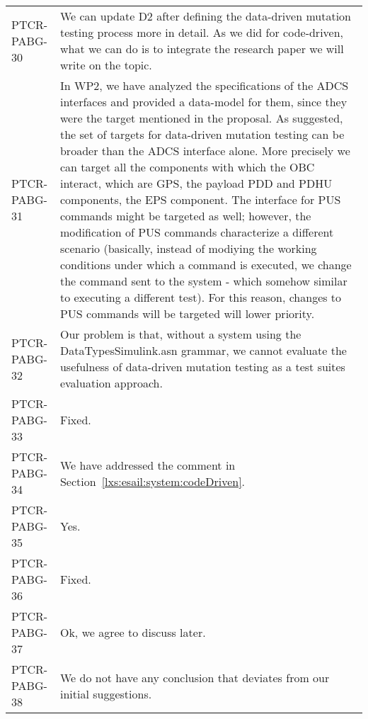 \begin{longtable}{|p{1.5cm}|p{12cm}|@{}}
\begin{minipage}{12cm}
\end{minipage}\\
\hline
PTCR-PABG-30&
\begin{minipage}{12cm}
We can update D2 after defining the data-driven mutation testing process more in detail. As we did for code-driven, what we can do is to integrate the research paper we will write on the topic.
\end{minipage}\\
\hline
PTCR-PABG-31&
\begin{minipage}{12cm}
In WP2, we have analyzed the specifications of the ADCS interfaces and provided a data-model for them, since they were the target mentioned in the proposal. As suggested, the set of targets for data-driven mutation testing can be broader than the ADCS interface alone. More precisely we can target all the components with which the OBC interact, which are GPS, the payload PDD and PDHU components, the EPS component. The interface for PUS commands might be targeted as well; however, the modification of PUS commands characterize a different scenario (basically,  instead of modiying the working conditions under which a command is executed, we change the command sent to the system - which somehow similar to executing a different test). For this reason, changes to PUS commands will be targeted will lower priority. 
\end{minipage}\\
\hline
PTCR-PABG-32&
\begin{minipage}{12cm}
Our problem is that, without a system using the DataTypesSimulink.asn grammar, we cannot evaluate the usefulness of data-driven mutation testing as a test suites evaluation approach.
\end{minipage}\\
\hline
PTCR-PABG-33&
\begin{minipage}{12cm}
Fixed.
\end{minipage}\\
\hline
PTCR-PABG-34&
\begin{minipage}{12cm}
We have addressed the comment in Section~\ref{lxs:esail:system:codeDriven}.
\end{minipage}\\
\hline
PTCR-PABG-35&
\begin{minipage}{12cm}
Yes.
\end{minipage}\\
\hline
PTCR-PABG-36&
\begin{minipage}{12cm}
Fixed.
\end{minipage}\\
\hline
PTCR-PABG-37&
\begin{minipage}{12cm}
Ok, we agree to discuss later.
\end{minipage}\\
\hline
PTCR-PABG-38&
\begin{minipage}{12cm}
We do not have any conclusion that deviates from our initial suggestions.
\end{minipage}\\
\hline
                                                
\end{longtable}
\normalsize

\clearpage